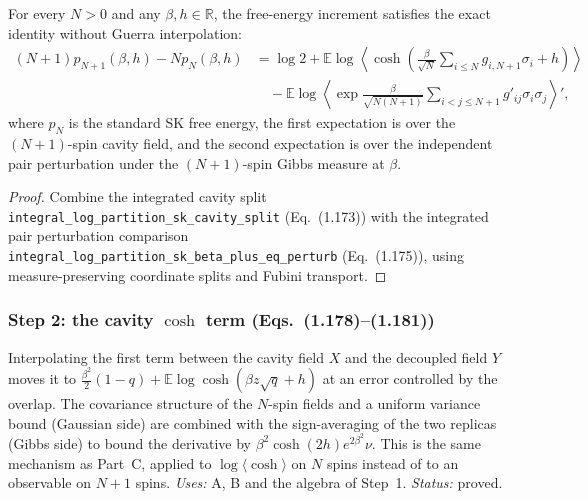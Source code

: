 \begin{theorem}
\label{thm:sg-tal:cavity-free-energy-increment}
  \leanok
{}
For every $N > 0$ and any $\beta, h \in \mathbb R$, the free-energy increment satisfies
the exact identity without Guerra interpolation:
\begin{align*}
(N+1) p_{N+1}(\beta, h) - N p_N(\beta, h)
&= \log 2 + \mathbb E \log \left\langle \cosh\left(\frac\beta{\sqrt N} \sum_{i \le N} g_{i,N+1} \sigma_i + h\right) \right\rangle \\
&\quad - \mathbb E \log \left\langle \exp \frac\beta{\sqrt{N(N+1)}} \sum_{i < j \le N+1} g'_{ij} \sigma_i \sigma_j \right\rangle',
\end{align*}
where $p_N$ is the standard SK free energy, the first expectation is over the $(N+1)$-spin cavity field,
and the second expectation is over the independent pair perturbation under the $(N+1)$-spin Gibbs measure at $\beta$.
\end{theorem}
\begin{proof}
  \leanok
Combine the integrated cavity split \texttt{integral\_log\_partition\_sk\_cavity\_split}
(Eq.~(1.173)) with the integrated pair perturbation comparison
\texttt{integral\_log\_partition\_sk\_beta\_plus\_eq\_perturb} (Eq.~(1.175)),
using measure-preserving coordinate splits and Fubini transport.
\end{proof}

\subsubsection{Step 2: the cavity $\cosh$ term (Eqs.~(1.178)--(1.181))}
Interpolating the first term between the cavity field $X$ and the decoupled field $Y$ moves it to
$\tfrac{\beta^2}{2}(1-q)+\mathbb E\log\cosh(\beta z\sqrt q+h)$ at an error controlled by the overlap.
The covariance structure of the $N$-spin fields and a uniform variance bound (Gaussian side) are combined
with the sign-averaging of the two replicas (Gibbs side) to bound the derivative by
$\beta^2\cosh(2h)e^{2\beta^2}\nu$.  This is the same mechanism as Part~C, applied to $\log\langle\cosh\rangle$
on $N$ spins instead of to an observable on $N+1$ spins.
\emph{Uses:} A, B and the algebra of Step~1.  \emph{Status:} proved.

